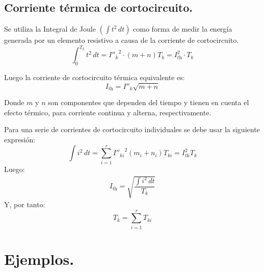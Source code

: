             \subsection{Corriente térmica de cortocircuito.}
                Se utiliza la Integral de Joule $\left(\int t^2\,dt\right)$ como forma de medir la energía generada por un elemento resistivo a causa de la corriente de cortocircuito.
                \begin{equation}
                    \int_0^{T_\textit{k}} t^2 \,dt = {I''_\textit{k}}^2 \cdot (m+n)T_\textit{k} = I_\textit{th}^2 \cdot T_\textit{k}
                \end{equation}

                Luego la corriente de cortocircuito térmica equivalente es:
                \begin{equation}
                    I_\textit{th} = I''_\textit{k}\sqrt{m+n}
                \end{equation}

                Donde $m$ y $n$ son componentes que dependen del tiempo y tienen en cuenta el efecto térmico, para corriente continua y alterna, respectivamente.\newline

                Para una serie de corrientes de cortocircuito individuales se debe usar la siguiente expresión:
                \begin{equation}
                    \int i^2\,dt = \sum\limits_{i=1}^{r} {I''_{\textit{k}i}}^2 (m_i+n_i) T_{\textit{k}i}=I_\textit{th}^2 T_\textit{k}
                \end{equation}
                Luego:
                \begin{eqnarray}
                    I_\textit{th} = \sqrt{\dfrac{\int i^2\,dt}{T_\textit{k}}}
                \end{eqnarray}
                Y, por tanto:
                \begin{equation}
                    T_\textit{k}=\sum\limits_{i=1}^{r} T_{\textit{k}i}
                \end{equation}

    \section{Ejemplos.}
